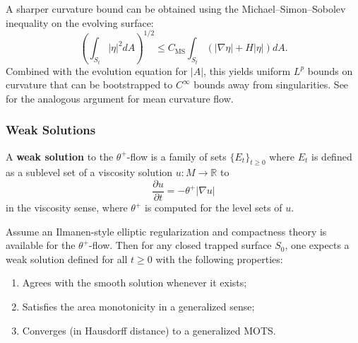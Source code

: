 \begin{remark}
A sharper curvature bound can be obtained using the Michael--Simon--Sobolev inequality on the evolving surface:
\begin{equation}
    \left(\int_{S_t} |\eta|^2 dA\right)^{1/2} \le C_{\mathrm{MS}} \int_{S_t} (|\nabla \eta| + H|\eta|) dA.
\end{equation}
Combined with the evolution equation for $|A|$, this yields uniform $L^p$ bounds on curvature that can be bootstrapped to $C^\infty$ bounds away from singularities. See \cite{huisken1984} for the analogous argument for mean curvature flow.
\end{remark}

\subsubsection{Weak Solutions}

\begin{definition}
\label{def:weak-solution}
A \textbf{weak solution} to the $\theta^+$-flow is a family of sets $\{E_t\}_{t \geq 0}$ where $E_t$ is defined as a sublevel set of a viscosity solution $u: M \to \mathbb{R}$ to
\begin{equation}
\frac{\partial u}{\partial t} = -\theta^+|\nabla u|
\end{equation}
in the viscosity sense, where $\theta^+$ is computed for the level sets of $u$.
\end{definition}

\begin{theorem}
\label{thm:weak-existence}
Assume an Ilmanen-style elliptic regularization and compactness theory is available for the $\theta^+$-flow. Then for any closed trapped surface $S_0$, one expects a weak solution defined for all $t \geq 0$ with the following properties:
\begin{enumerate}
\item Agrees with the smooth solution whenever it exists;
\item Satisfies the area monotonicity in a generalized sense;
\item Converges (in Hausdorff distance) to a generalized MOTS.
\end{enumerate}
\end{theorem}

